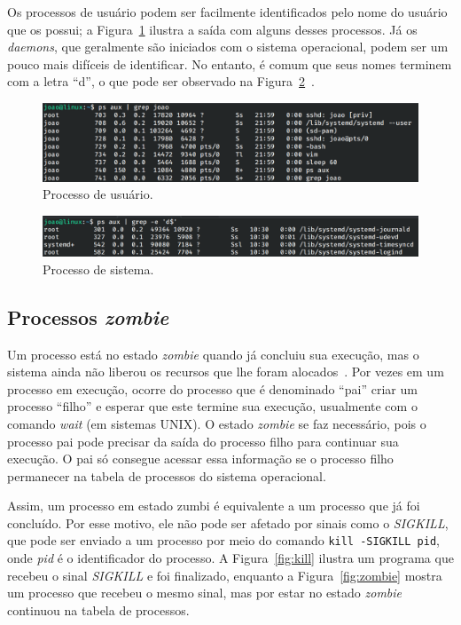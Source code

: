 \documentclass[
	12pt,				%
	oneside,   	        %
	a4paper,			%
	english,			%
	french,				%
	spanish,			%
	brazil,				%
	]{pacotes/abntex2}
\begin{document}
Os processos de usuário podem ser facilmente identificados pelo nome do usuário que os possui; a Figura~\ref{fig:user} ilustra a saída com alguns desses processos. Já os \textit{daemons}, que geralmente são iniciados com o sistema operacional, podem ser um pouco mais difíceis de identificar. No entanto, é comum que seus nomes terminem com a letra ``d'', o que pode ser observado na Figura~\ref{fig:daemon}~\cite{negus2012}.

\begin{figure}[H]
  \centering
  \includegraphics[scale=0.45]{figuras/user.png}
  \caption{Processo de usuário.}
  \label{fig:user}
\end{figure}

\begin{figure}[H]
  \centering
  \includegraphics[scale=0.45]{figuras/daemons.png}
  \caption{Processo de sistema.}
  \label{fig:daemon}
\end{figure}

\subsection{Processos \textit{zombie}}
\label{subsec:zombie}

Um processo está no estado \textit{zombie} quando já concluiu sua execução, mas o sistema ainda não liberou os recursos que lhe foram alocados~\cite{stallings2018}. Por vezes em um processo em execução, ocorre do processo que é denominado ``pai'' criar um processo ``filho'' e esperar que este termine sua execução, usualmente com o comando \textit{wait} (em sistemas UNIX). O estado \textit{zombie} se faz necessário, pois o processo pai pode precisar da saída do processo filho para continuar sua execução. O pai só consegue acessar essa informação se o processo filho permanecer na tabela de processos do sistema operacional.

Assim, um processo em estado zumbi é equivalente a um processo que já foi concluído. Por esse motivo, ele não pode ser afetado por sinais como o \textit{SIGKILL}, que pode ser enviado a um processo por meio do comando \texttt{kill -SIGKILL pid}, onde \textit{pid} é o identificador do processo. A Figura~\ref{fig:kill} ilustra um programa que recebeu o sinal \textit{SIGKILL} e foi finalizado, enquanto a Figura~\ref{fig:zombie} mostra um processo que recebeu o mesmo sinal, mas por estar no estado \textit{zombie} continuou na tabela de processos.
\end{document}
